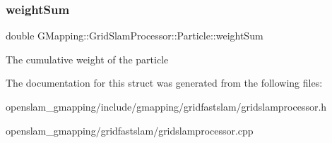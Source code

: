 \subsubsection{\texorpdfstring{weight\+Sum}{weightSum}}
{\footnotesize\ttfamily double G\+Mapping\+::\+Grid\+Slam\+Processor\+::\+Particle\+::weight\+Sum}

The cumulative weight of the particle 

The documentation for this struct was generated from the following files\+:\begin{DoxyCompactItemize}
\item 
openslam\+\_\+gmapping/include/gmapping/gridfastslam/gridslamprocessor.\+h\item 
openslam\+\_\+gmapping/gridfastslam/gridslamprocessor.\+cpp\end{DoxyCompactItemize}
